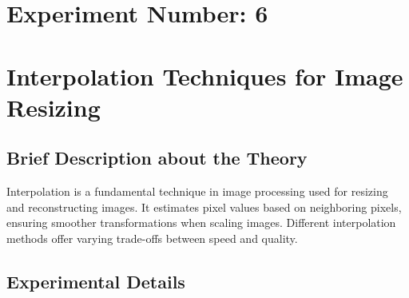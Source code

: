 \documentclass[12pt,a4paper]{article}
\begin{document}
\newpage
\section*{Experiment Number: 6}
\section{Interpolation Techniques for Image Resizing}

\subsection{Brief Description about the Theory}
Interpolation is a fundamental technique in image processing used for resizing and reconstructing images. It estimates pixel values based on neighboring pixels, ensuring smoother transformations when scaling images. Different interpolation methods offer varying trade-offs between speed and quality.

\subsection{Experimental Details}
\end{document}
